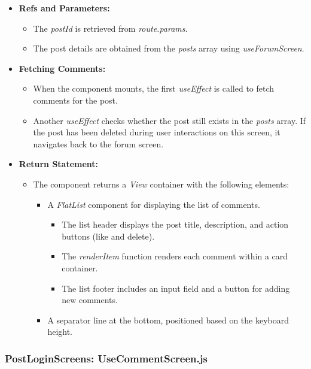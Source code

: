 \begin{itemize}
    \item \textbf{Refs and Parameters:}
    \begin{itemize}
        \item The \textit{postId} is retrieved from \textit{route.params}.
        \item The post details are obtained from the \textit{posts} array using \textit{useForumScreen}.
    \end{itemize}

    \item \textbf{Fetching Comments:}
    \begin{itemize}
        \item When the component mounts, the first \textit{useEffect} is called to fetch comments for the post.
        \item Another \textit{useEffect} checks whether the post still exists in the \textit{posts} array. If the post has been deleted during user interactions on this screen, it navigates back to the forum screen.
    \end{itemize}

    \item \textbf{Return Statement:}
    \begin{itemize}
        \item The component returns a \textit{View} container with the following elements:
        \begin{itemize}
            \item A \textit{FlatList} component for displaying the list of comments.
            \begin{itemize}
                \item The list header displays the post title, description, and action buttons (like and delete).
                \item The \textit{renderItem} function renders each comment within a card container.
                \item The list footer includes an input field and a button for adding new comments.
            \end{itemize}
            \item A separator line at the bottom, positioned based on the keyboard height.
        \end{itemize}
    \end{itemize}
\end{itemize}

\subsubsection{PostLoginScreens: UseCommentScreen.js}

